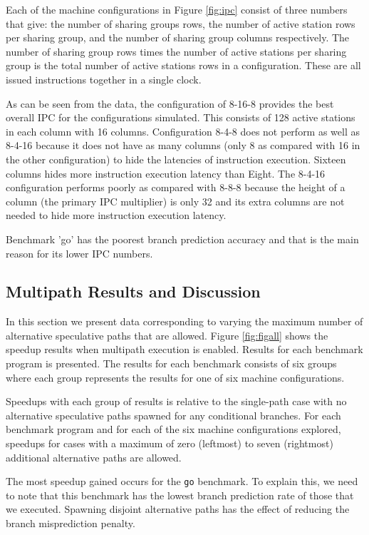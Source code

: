 \documentclass[10pt,dvips]{article}
\begin{document}
Each of the machine configurations in Figure \ref{fig:ipc} consist of
three numbers that give: the number of sharing groups rows, the number of
active station rows per sharing group, and the number of sharing group
columns respectively.  The number of sharing group rows times the number
of active stations per sharing group is the total number of active
stations rows in a configuration.  These are all issued instructions
together in a single clock.

As can be seen from the data, the configuration of 8-16-8 provides
the best overall IPC for the configurations simulated.  This consists
of 128 active stations in each column with 16 columns.
Configuration 8-4-8 does not perform as well as 8-4-16 because it does not
have as many columns (only 8 as compared with 16 in the other configuration)
to hide the latencies of instruction execution.  Sixteen columns 
hides more instruction execution latency than Eight.  The 8-4-16
configuration performs poorly as compared with 8-8-8 because the height
of a column (the primary IPC multiplier) is only 32 and its extra
columns are not needed to hide more instruction execution latency.

Benchmark 'go' has the poorest branch prediction accuracy and that is 
the main reason for its lower IPC numbers.  
%
\subsection{Multipath Results and Discussion}
%
In this section we present data corresponding to varying the
maximum number of alternative speculative paths that are allowed.
Figure \ref{fig:figall} shows the speedup results
when multipath execution is enabled.  Results for
each benchmark program is presented.  The results for each benchmark
consists of six groups where each group represents the results
for one of six machine configurations.

Speedups with each group of results is relative to the
single-path case with no alternative speculative paths spawned
for any conditional branches.  For each benchmark program and
for each of the six machine configurations explored, speedups
for cases with a maximum
of zero (leftmost) to seven (rightmost) additional alternative
paths are allowed.

The most speedup gained occurs for the {\tt go} benchmark.  
To explain this, we need
to note that this benchmark has the lowest branch prediction rate
of those that we executed.
Spawning disjoint alternative paths has the effect of reducing the
branch misprediction penalty.
\end{document}
